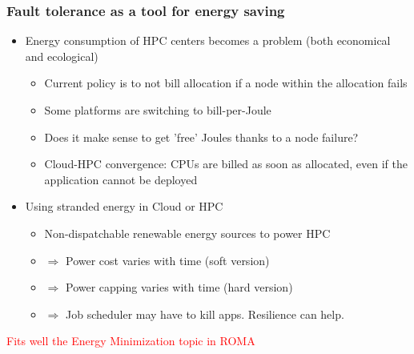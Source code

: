\begin{frame}
  \frametitle{Fault tolerance as a tool for energy saving}

  \begin{itemize}
  \item Energy consumption of HPC centers becomes a problem (both economical and ecological)
    \begin{itemize}
    \item Current policy is to not bill allocation if a node within the allocation fails
    \item Some platforms are switching to bill-per-Joule
    \item Does it make sense to get 'free' Joules thanks to a node failure?
    \item Cloud-HPC convergence: CPUs are billed as soon as allocated, even if the application cannot be deployed
    \end{itemize}
  \item Using stranded energy in Cloud or HPC
    \begin{itemize}
    \item Non-dispatchable renewable energy sources to power HPC
    \item $\Rightarrow$ Power cost varies with time (soft version)
    \item $\Rightarrow$ Power capping varies with time (hard version)
    \item $\Rightarrow$ Job scheduler may have to kill apps. Resilience can help.
    \end{itemize}
  \end{itemize}
  \begin{center}
    \textcolor{red}{Fits well the Energy Minimization topic in ROMA}
  \end{center}
\end{frame}


